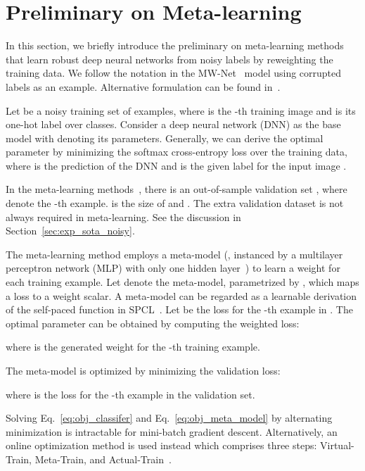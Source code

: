 \documentclass[final]{cvpr}
\begin{document}
\section{Preliminary on Meta-learning}\label{sec:preliminary}

In this section, we briefly introduce the preliminary on meta-learning methods~\cite{ren2018learning, shu2019meta} that learn robust deep neural networks from noisy labels by reweighting the training data.
We follow the notation in the MW-Net~\cite{shu2019meta} model using corrupted labels as an example. Alternative formulation can be found in~\cite{ren2018learning,wang2020training,vyas2020learning}.

Let  be a noisy training set of  examples, 
where  is the -th training image and  is its one-hot label over  classes.
Consider a deep neural network (DNN) as the base model  with  denoting its parameters.
Generally, we can derive the optimal parameter  by minimizing the softmax cross-entropy loss  over the training data, where  is the prediction of the DNN and  is the given label for the input image .


In the meta-learning methods~\cite{ren2018learning, shu2019meta}, there is an out-of-sample validation set , where  denote the -th example.  is the size of  and . The extra validation dataset is not always required in meta-learning. See the discussion in Section~\ref{sec:exp_sota_noisy}. 

The meta-learning method employs a meta-model (\eg, instanced by a multilayer perceptron network (MLP) with only one hidden layer~\cite{shu2019meta}) to learn a weight for each training example. Let  denote the meta-model, parametrized by , which maps a loss to a weight scalar. A meta-model can be regarded as a learnable derivation of the self-paced function in SPCL~\cite{jiang2015self}.
Let  be the loss for the -th example in . The optimal parameter  can be obtained by computing the weighted loss: 

where  is the generated weight for the -th training example.

The meta-model is optimized by minimizing the validation loss:

where  is the loss for the -th example in the validation set.


Solving Eq.~\eqref{eq:obj_classifer} and Eq.~\eqref{eq:obj_meta_model} by alternating minimization is intractable for mini-batch gradient descent. Alternatively, an online optimization method is used instead which comprises three steps: Virtual-Train, Meta-Train, and Actual-Train~\cite{wei2020combating}. 
\end{document}
